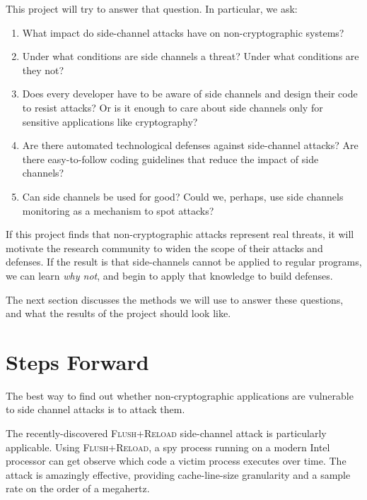 \documentclass{acm_proc_article-sp}
\begin{document}
This project will try to answer that question. In particular, we ask:

\begin{enumerate}
\item What impact do side-channel attacks have on non-cryptographic systems?

\item Under what conditions are side channels a threat? Under what conditions
      are they not?

\item Does every developer have to be aware of side channels and design their
      code to resist attacks? Or is it enough to care about side channels only
      for sensitive applications like cryptography?

\item Are there automated technological defenses against side-channel attacks?
      Are there easy-to-follow coding guidelines that reduce the impact of side
      channels?

\item Can side channels be used for good? Could we, perhaps, use side channels
      monitoring as a mechanism to spot attacks?
\end{enumerate}

If this project finds that non-cryptographic attacks represent real threats, it
will motivate the research community to widen the scope of their attacks and
defenses. If the result is that side-channels cannot be applied to regular
programs, we can learn \emph{why not}, and begin to apply that knowledge to
build defenses.

The next section discusses the methods we will use to answer these questions,
and what the results of the project should look like.

\section{Steps Forward}
\label{sec:stepsforward}

The best way to find out whether non-cryptographic applications are vulnerable
to side channel attacks is to attack them.

The recently-discovered \textsc{Flush+Reload} \cite{yarom2013flush} side-channel
attack is particularly applicable. Using \textsc{Flush+Reload}, a spy process
running on a modern Intel processor can get observe which code a victim process
executes over time. The attack is amazingly effective, providing cache-line-size
granularity and a sample rate on the order of a megahertz.
\end{document}

